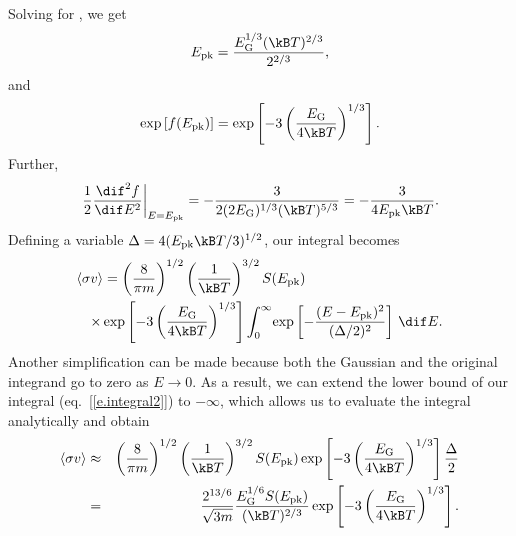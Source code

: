 \begin{sidebar}
Solving for \Epk, we get
\[
\Epk = \frac{\EG^{1/3}(\kB T)^{2/3}}{2^{2/3}},
\]
and 
\[ \exp\left[f(\Epk)\right] = \exp\left[-3\left(\frac{\EG}{4\kB T}\right)^{1/3}\right].
\]
Further,
\[
\left.\frac{1}{2}\frac{\dif^{2}f}{\dif E^{2}}\right|_{E=\Epk} = -\frac{3}{2(2\EG)^{1/3}(\kB T)^{5/3}} = -\frac{3}{4\Epk \kB T}.
\]
Defining a variable $\Delta = 4(\Epk \kB T/3)^{1/2}$, our integral becomes
\begin{eqnarray}\label{e.integral2}
\lefteqn{\langle\sigma v\rangle = \left(\frac{8}{\pi m}\right)^{1/2}\left(\frac{1}{\kB T}\right)^{3/2} S(\Epk)} \nonumber\\
&&\times 
  \exp\left[-3\left(\frac{\EG}{4\kB T}\right)^{1/3}\right]\int_{0}^{\infty}\!\exp\left[-\frac{(E-\Epk)^{2}}{(\Delta/2)^{2}}\right]\,\dif E.
\end{eqnarray}
Another simplification can be made because both the Gaussian and the original integrand go to zero as $E\to 0$.  As a result, we can extend the lower bound of our integral (eq.~[\ref{e.integral2}]) to $-\infty$, which allows us to evaluate the integral analytically and obtain
\begin{eqnarray}\label{e.rate2}
\langle\sigma v\rangle &\approx& \left(\frac{8}{\pi m}\right)^{1/2}\left(\frac{1}{\kB T}\right)^{3/2} S(\Epk) \exp\left[-3\left(\frac{\EG}{4\kB T}\right)^{1/3}\right]\frac{\Delta}{2}\nonumber\\
 &=& \frac{2^{13/6}}{\sqrt{3m}}\frac{\EG^{1/6}S(\Epk)}{(\kB T)^{2/3}} \exp\left[-3\left(\frac{\EG}{4\kB T}\right)^{1/3}\right]  .
\end{eqnarray}
\end{sidebar}


